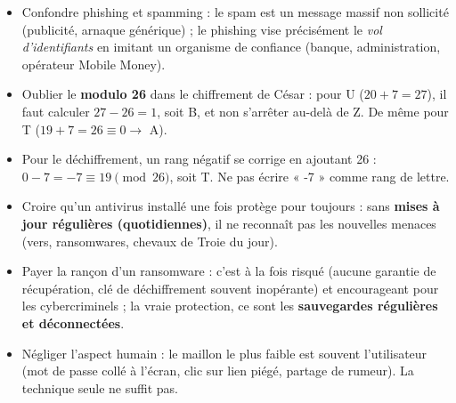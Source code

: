 \documentclass[11pt]{article}
\newcommand{\cle}[1]{{\popxbold\color{popdark}#1}}
\newcounter{popsec}
\newcounter{popsub}
\newcommand{\courssub}[1]{%
  \stepcounter{popsub}%
  \par\vspace{9pt}\noindent{\popxbold\fontsize{11.5}{13}\selectfont\color{popink}{\color{poporange}\thepopsec.\thepopsub}\hspace{6pt}#1}\par\nopagebreak\vspace{4pt}
}
\begin{document}
\begin{attention}
\begin{itemize}
  \item Confondre \cle{phishing} et \cle{spamming} : le spam est un message massif non sollicité (publicité, arnaque générique) ; le phishing vise précisément le \emph{vol d'identifiants} en imitant un organisme de confiance (banque, administration, opérateur Mobile Money).
  \item Oublier le \textbf{modulo 26} dans le chiffrement de César : pour U ($20 + 7 = 27$), il faut calculer $27 - 26 = 1$, soit B, et non s'arrêter au-delà de Z. De même pour T ($19+7=26 \equiv 0 \rightarrow$ A).
  \item Pour le déchiffrement, un rang négatif se corrige en ajoutant 26 : $0 - 7 = -7 \equiv 19 \pmod{26}$, soit T. Ne pas écrire « -7 » comme rang de lettre.
  \item Croire qu'un antivirus installé une fois protège pour toujours : sans \textbf{mises à jour régulières (quotidiennes)}, il ne reconnaît pas les nouvelles menaces (vers, ransomwares, chevaux de Troie du jour).
  \item Payer la rançon d'un ransomware : c'est à la fois risqué (aucune garantie de récupération, clé de déchiffrement souvent inopérante) et encourageant pour les cybercriminels ; la vraie protection, ce sont les \textbf{sauvegardes régulières et déconnectées}.
  \item Négliger l'aspect humain : le maillon le plus faible est souvent l'utilisateur (mot de passe collé à l'écran, clic sur lien piégé, partage de rumeur). La technique seule ne suffit pas.
\end{itemize}
\end{attention}

\courssub{Bilan de l'activité}
\end{document}
